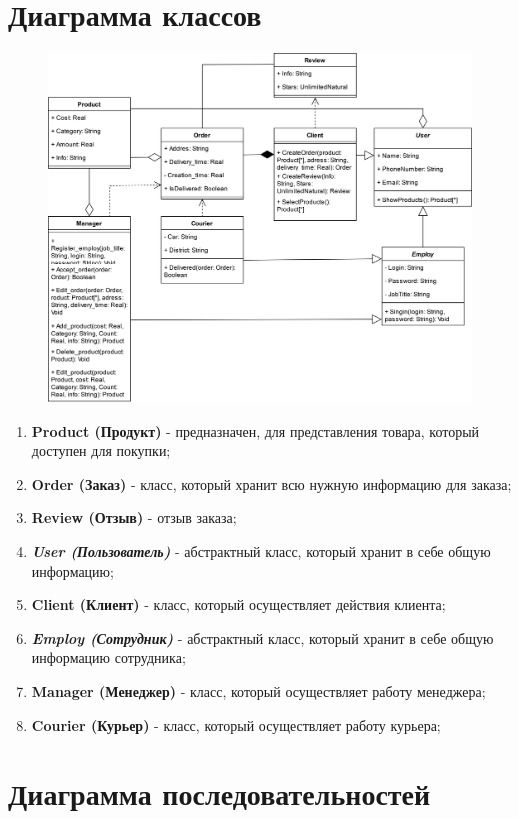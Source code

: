 \documentclass[a4paper]{report}
\begin{document}
\section{Диаграмма классов}
\begin{figure}[H]
    \centering
    \includegraphics[width=\textwidth]{Диаграмма классов.png}
\end{figure}
\begin{enumerate}
    \item \textbf{Product (Продукт)} - предназначен, для представления товара, который доступен для покупки;
    \item \textbf{Order (Заказ)} - класс, который хранит всю нужную информацию для заказа;
    \item \textbf{Review (Отзыв)} - отзыв заказа;
    \item \textbf{\textit{User (Пользователь)}} - абстрактный класс, который хранит в себе общую информацию;
    \item \textbf{Client (Клиент)} - класс, который осуществляет действия клиента;
    \item \textbf{\textit{Employ (Сотрудник)}} - абстрактный класс, который хранит в себе общую информацию сотрудника;
    \item \textbf{Manager (Менеджер)} - класс, который осуществляет работу менеджера;
    \item \textbf{Courier (Курьер)} - класс, который осуществляет работу курьера;
\end{enumerate}
\newpage
\section{Диаграмма последовательностей}
\end{document}
